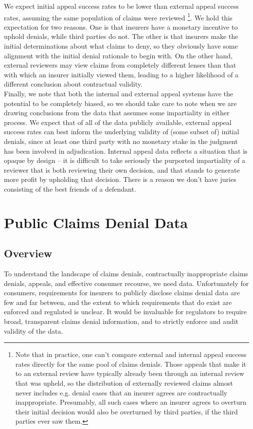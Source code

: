 \documentclass[12pt, a4paper,twoside]{report}
\theoremstyle{plain} %
\theoremstyle{definition} %
\theoremstyle{remark} %
\numberwithin{equation}{chapter}
\begin{document}
		We expect initial appeal success rates to be lower than external appeal success rates, assuming the same population of claims were reviewed \footnote{Note that in practice, one can't compare external and internal appeal success rates directly for the same pool of claims denials. Those appeals that make it to an external review have typically already been through an internal review that was upheld, so the distribution of externally reviewed claims almost never includes e.g. denial cases that an insurer agrees are contractually inappropriate. Presumably, all such cases where an insurer agrees to overturn their initial decision would also be overturned by third parties, if the third parties ever saw them.}. We hold this expectation for two reasons. One is that insurers have a monetary incentive to uphold denials, while third parties do not. The other is that insurers make the initial determinations about what claims to deny, so they obviously have some alignment with the initial denial rationale to begin with. On the other hand, external reviewers may view claims from completely different lenses than that with which an insurer initially viewed them, leading to a higher likelihood of a different conclusion about contractual validity.\\
		
		Finally, we note that both the internal and external appeal systems have the potential to be completely biased, so we should take care to note when we are drawing conclusions from the data that assumes some impartiality in either process. We expect that of all of the data publicly available, external appeal success rates can best inform the underlying validity of (some subset of) initial denials, since at least one third party with no monetary stake in the judgment has been involved in adjudication. Internal appeal data reflects a situation that is opaque by design -- it is difficult to take seriously the purported impartiality of a reviewer that is both reviewing their own decision, and that stands to generate more profit by upholding that decision. There is a reason we don't have juries consisting of the best friends of a defendant.
		
		\section{Public Claims Denial Data}\label{publicdata}
				
		\subsection{Overview}\label{publicdata:overview}
		To understand the landscape of claims denials, contractually inappropriate claims denials, appeals, and effective consumer recourse, we need data. Unfortunately for consumers, requirements for insurers to publicly disclose claims denial data are few and far between, and the extent to which requirements that do exist are enforced and regulated is unclear. It would be invaluable for regulators to require broad, transparent claims denial information, and to strictly enforce and audit validity of the data.
\end{document}

